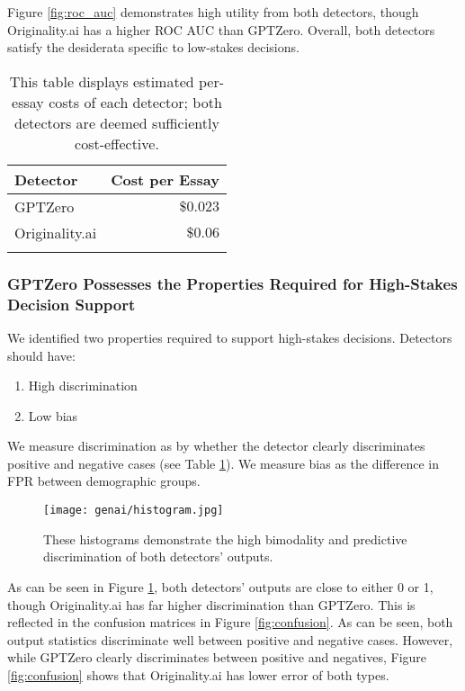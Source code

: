 Figure \ref{fig:roc_auc} demonstrates high utility from both detectors, though Originality.ai has a higher ROC AUC than GPTZero. Overall, both detectors satisfy the desiderata specific to low-stakes decisions.

\begin{table}[htbp]
  \centering
  \caption{This table displays estimated per-essay costs of each detector; both detectors are deemed sufficiently cost-effective.}
  \label{tab:detector_cost}
  \begin{tabular}{l r}
      \toprule
      Detector & Cost per Essay \\
      \midrule
      GPTZero & $\$0.023$ \\
      Originality.ai & $\$0.06$\\
      \bottomrule\\
  \end{tabular}
\end{table}

\subsubsection{GPTZero Possesses the Properties Required for High-Stakes Decision Support}\label{sssec:highstakes}
We identified two properties required to support high-stakes decisions. Detectors should have:

\begin{enumerate}
    \item High discrimination
    \item Low bias
\end{enumerate}

We measure discrimination as by whether the detector clearly discriminates positive and negative cases (see Table \ref{tab:detector_cost}). We measure bias as the difference in FPR between demographic groups.

\begin{figure}[htb]
  \centering
  \texttt{[image: genai/histogram.jpg]}
  \caption{These histograms demonstrate the high bimodality and predictive discrimination of both detectors' outputs.}
  \label{fig:histogram}
\end{figure}

As can be seen in Figure \ref{fig:histogram}, both detectors' outputs are close to either 0 or 1, though Originality.ai has far higher discrimination than GPTZero. This is reflected in the confusion matrices in Figure \ref{fig:confusion}. As can be seen, both output statistics discriminate well between positive and negative cases. However, while GPTZero clearly discriminates between positive and negatives, Figure \ref{fig:confusion} shows that Originality.ai has lower error of both types.

